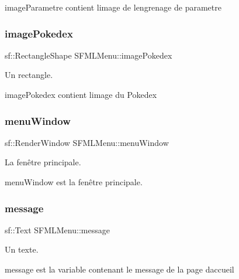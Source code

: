 image\+Parametre contient l\textquotesingle{}image de l\textquotesingle{}engrenage de parametre \mbox{\label{class_s_f_m_l_menu_a91b51e10df431baa523e25a1d49f435d}} 
\subsubsection{\texorpdfstring{image\+Pokedex}{imagePokedex}}
{\footnotesize\ttfamily sf\+::\+Rectangle\+Shape S\+F\+M\+L\+Menu\+::image\+Pokedex\hspace{0.3cm}{\ttfamily [private]}}



Un rectangle. 

image\+Pokedex contient l\textquotesingle{}image du Pokedex \mbox{\label{class_s_f_m_l_menu_a6422047c4cfef4482c49515348e818b6}} 
\subsubsection{\texorpdfstring{menu\+Window}{menuWindow}}
{\footnotesize\ttfamily sf\+::\+Render\+Window S\+F\+M\+L\+Menu\+::menu\+Window\hspace{0.3cm}{\ttfamily [private]}}



La fenêtre principale. 

menu\+Window est la fenêtre principale. \mbox{\label{class_s_f_m_l_menu_a033a42111a787bd3a7ed6d4d80c91549}} 
\subsubsection{\texorpdfstring{message}{message}}
{\footnotesize\ttfamily sf\+::\+Text S\+F\+M\+L\+Menu\+::message\hspace{0.3cm}{\ttfamily [private]}}



Un texte. 

message est la variable contenant le message de la page d\textquotesingle{}accueil \mbox{\label{class_s_f_m_l_menu_aae5b7c3d69f351ab38ec95b3c55705d2}} 
